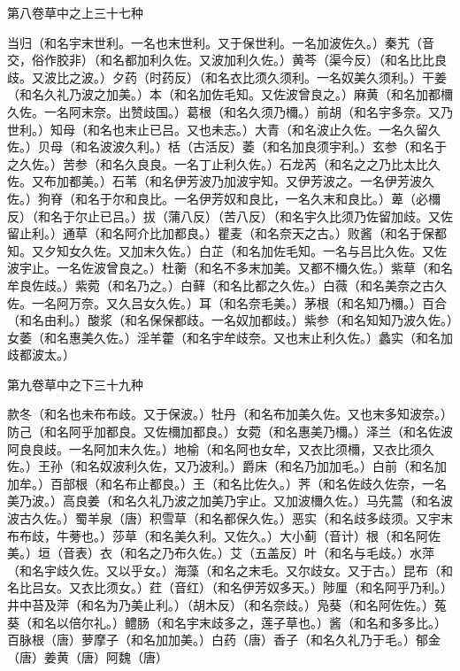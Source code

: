 \documentclass[a4paper,12pt,UTF8,twoside]{ctexbook}
\begin{document}
第八卷草中之上三十七种

当归（和名宇末世利。一名也末世利。又于保世利。一名加波佐久。）秦艽（音交，俗作胶非）（和名都加利久佐。又波加利久佐。）黄芩（渠今反）（和名比比良歧。又波比之波。）夕药（时药反）（和名衣比须久须利。一名奴美久须利。）干姜（和名久礼乃波之加美。）本（和名加佐毛知。又佐波曾良之。）麻黄（和名加都檷久佐。一名阿末奈。出赞歧国。）葛根（和名久须乃檷。）前胡（和名宇多奈。又乃世利。）知母（和名也末止已吕。又也未志。）大青（和名波止久佐。一名久留久佐。）贝母（和名波波久利。）栝（古活反）萎（和名加良须宇利。）玄参（和名于之久佐。）苦参（和名久良良。一名丁止利久佐。）石龙芮（和名之之乃比太比久佐。又布加都美。）石苇（和名伊芳波乃加波宇知。又伊芳波之。一名伊芳波久佐。）狗脊（和名于尔和良比。一名伊芳奴和良比，一名久末和良比。）萆（必檷反）（和名于尔止已吕。）拔（蒲八反）（苦八反）（和名宇久比须乃佐留加歧。又佐留止利。）通草（和名阿介比加都良。）瞿麦（和名奈天之古。）败酱（和名于保都知。又夕知女久佐。又加末久佐。）白芷（和名加佐毛知。一名与吕比久佐。又佐波宇止。一名佐波曾良之。）杜蘅（和名不多末加美。又都不檷久佐。）紫草（和名牟良佐歧。）紫菀（和名乃之。）白藓（和名比都之久佐。）白薇（和名美奈之古久佐。一名阿万奈。又久吕女久佐。）耳（和名奈毛美。）茅根（和名知乃檷。）百合（和名由利。）酸浆（和名保保都歧。一名奴加都歧。）紫参（和名知知乃波久佐。）女萎（和名惠美久佐。）淫羊藿（和名宇牟歧奈。又也末止利久佐。）蠡实（和名加歧都波太。）

第九卷草中之下三十九种

款冬（和名也未布布歧。又于保波。）牡丹（和名布加美久佐。又也末多知波奈。）防己（和名阿乎加都良。又佐檷加都良。）女菀（和名惠美乃檷。）泽兰（和名佐波阿良良歧。一名阿加末久佐。）地榆（和名阿也女牟，又衣比须檷，又衣比须久佐。）王孙（和名奴波利久佐，又乃波利。）爵床（和名乃加加毛。）白前（和名加加牟。）百部根（和名布止都良。）王（和名比佐久。）荠（和名佐歧久佐奈，一名美乃波。）高良姜（和名久礼乃波之加美乃宇止。又加波檷久佐。）马先蒿（和名波波古久佐。）蜀羊泉（唐）积雪草（和名都保久佐。）恶实（和名歧多歧须。又宇末布布歧，牛蒡也。）莎草（和名美久利。又佐久。）大小蓟（音计）根（和名阿佐美。）垣（音表）衣（和名之乃布久佐。）艾（五盖反）叶（和名与毛歧。）水萍（和名宇歧久佐。又以乎女。）海藻（和名之末毛。又尔歧女。又于古。）昆布（和名比吕女。又衣比须女。）荭（音红）（和名伊芳奴多天。）陟厘（和名阿乎乃利。）井中苔及萍（和名为乃美止利。）（胡木反）（和名奈歧。）凫葵（和名阿佐佐。）菟葵（和名以倍尔礼。）鳢肠（和名宇末歧多之，莲子草也。）酱（和名和多多比。）百脉根（唐）萝摩子（和名加加美。）白药（唐）香子（和名久礼乃于毛。）郁金（唐）姜黄（唐）阿魏（唐）
\end{document}
